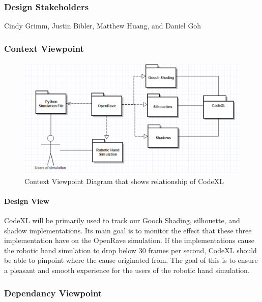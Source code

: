 \begin{flushleft}
\subsubsection{Design Stakeholders}
Cindy Grimm, Justin Bibler, Matthew Huang, and Daniel Goh

\subsubsection{Context Viewpoint}

\begin{figure} [H]
  \includegraphics[scale=0.9]{designdoc_v1/CodeXL_Context.eps}
  \caption
{ \newline \hspace{\linewidth}
Context Viewpoint Diagram that shows relationship of CodeXL}
  \label{fig:CodeXL_Context}
\end{figure}

\paragraph{Design View}
CodeXL will be primarily used to track our Gooch Shading, silhouette, and shadow implementations.
Its main goal is to monitor the effect that these three implementation have on the OpenRave simulation.
If the implementations cause the robotic hand simulation to drop below 30 frames per second, CodeXL should be able to pinpoint where the cause originated from.
The goal of this is to ensure a pleasant and smooth experience for the users of the robotic hand simulation.

\subsubsection{Dependancy Viewpoint}


\end{flushleft}
